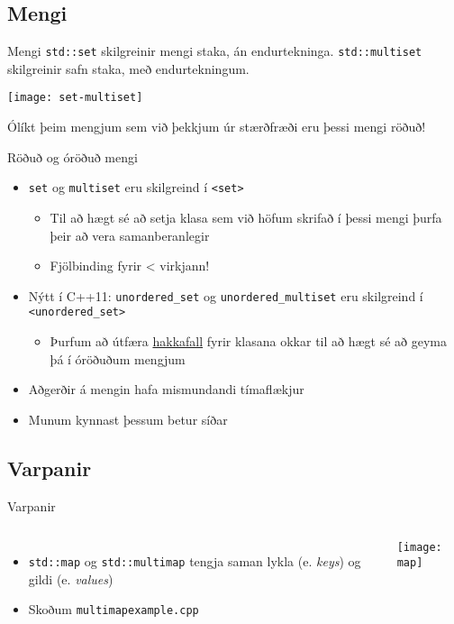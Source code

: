 \documentclass[handout]{beamer}
\begin{document}
\subsection{Mengi}

\begin{frame}{Mengi}
\texttt{std::set} skilgreinir mengi staka, án endurtekninga. \texttt{std::multiset} skilgreinir safn staka, með endurtekningum.

\begin{center}
\texttt{[image: set-multiset]}
\end{center}


Ólíkt þeim mengjum sem við þekkjum úr stærðfræði eru þessi mengi röðuð!
\end{frame}

\begin{frame}{Röðuð og óröðuð mengi}
\begin{itemize}
 \item \texttt{set} og \texttt{multiset} eru skilgreind í \texttt{<set>}
 \begin{itemize}
  \item Til að hægt sé að setja klasa sem við höfum skrifað í þessi mengi þurfa þeir að vera samanberanlegir
  \item Fjölbinding fyrir < virkjann!
 \end{itemize}
 \item Nýtt í C++11: \texttt{unordered\_set} og \texttt{unordered\_multiset} eru skilgreind í \texttt{<unordered\_set>}
 \begin{itemize}
  \item Þurfum að útfæra \href{http://en.cppreference.com/w/cpp/utility/hash}{hakkafall} fyrir klasana okkar til að hægt sé að geyma þá í óröðuðum mengjum
 \end{itemize}
 \item Aðgerðir á mengin hafa mismundandi tímaflækjur
 \item Munum kynnast þessum betur síðar
\end{itemize}
\end{frame}

\subsection{Varpanir}

\begin{frame}{Varpanir}
\begin{columns}
\begin{itemize}
 \item \texttt{std::map} og \texttt{std::multimap} tengja saman lykla (e. \emph{keys}) og gildi (e. \emph{values})
 \item Skoðum \texttt{multimapexample.cpp}
\end{itemize}
\begin{center}
\texttt{[image: map]}
\end{center}
\end{columns}
\end{frame}
\end{document}
